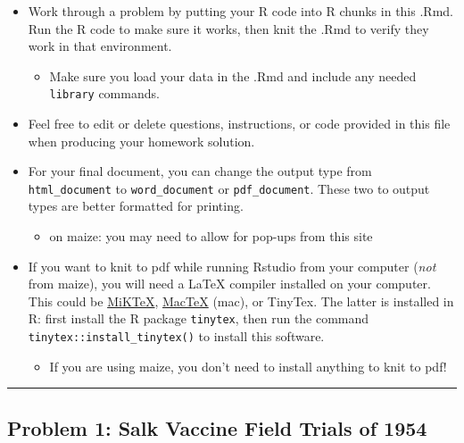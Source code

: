 \documentclass[
]{article}
\providecommand{\tightlist}{%
  \setlength{\itemsep}{0pt}\setlength{\parskip}{0pt}}
\begin{document}
\begin{itemize}
\tightlist
\item
  Work through a problem by putting your R code into R chunks in this
  .Rmd. Run the R code to make sure it works, then knit the .Rmd to
  verify they work in that environment.

  \begin{itemize}
  \tightlist
  \item
    Make sure you load your data in the .Rmd and include any needed
    \texttt{library} commands.
  \end{itemize}
\item
  Feel free to edit or delete questions, instructions, or code provided
  in this file when producing your homework solution.
\item
  For your final document, you can change the output type from
  \texttt{html\_document} to \texttt{word\_document} or
  \texttt{pdf\_document}. These two to output types are better formatted
  for printing.

  \begin{itemize}
  \tightlist
  \item
    on maize: you may need to allow for pop-ups from this site
  \end{itemize}
\item
  If you want to knit to pdf while running Rstudio from your computer
  (\emph{not} from maize), you will need a LaTeX compiler installed on
  your computer. This could be \href{https://miktex.org/}{MiKTeX},
  \href{http://www.tug.org/mactex/}{MacTeX} (mac), or TinyTex. The
  latter is installed in R: first install the R package
  \texttt{tinytex}, then run the command
  \texttt{tinytex::install\_tinytex()} to install this software.

  \begin{itemize}
  \tightlist
  \item
    If you are using maize, you don't need to install anything to knit
    to pdf!
  \end{itemize}
\end{itemize}

\begin{center}\rule{0.5\linewidth}{0.5pt}\end{center}

\hypertarget{problem-1-salk-vaccine-field-trials-of-1954}{%
\subsection{Problem 1: Salk Vaccine Field Trials of
1954}\label{problem-1-salk-vaccine-field-trials-of-1954}}
\end{document}
